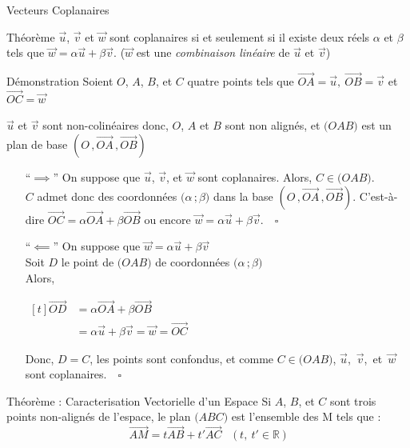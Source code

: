 \documentclass{coursbook}
\begin{document}
\begin{Gpartie}{Vecteurs Coplanaires}
\begin{Spartie}{Théorème}
            $\vec{u}$, $\vec{v}$ et $\vec{w}$ sont coplanaires si et seulement si il existe deux réels $\alpha$ et $\beta$ tels que $\vec{w}=\alpha\vec{u}+\beta\vec{v}$. \quad\big($\vec{w}$ est une \emph{combinaison linéaire} de $\vec{u}$ et $\vec{v}$\big)
            \begin{SSpartie}{Démonstration} 
                Soient $O$, $A$, $B$, et $C$ quatre points tels que $\overrightarrow{OA}=\vec{u},~\overrightarrow{OB}=\vec{v}$ et $\overrightarrow{OC}=\vec{w}$

                $\vec{u}$ et $\vec{v}$ sont non-colinéaires donc, $O$, $A$ et $B$ sont non alignés, et $\big(OAB\big)$ est un plan de base $\left(O\,,\overrightarrow{OA}\,,\overrightarrow{OB}\right)$
                \begin{itemize}[leftmargin=7ex]
                    \item[``$\implies$''] On suppose que $\vec{u}$, $\vec{v}$, et $\vec{w}$ sont coplanaires. Alors, $C\in\big(OAB\big)$. \\ $C$ admet donc des coordonnées $\big(\alpha\,;\beta\big)$ dans la base $\left(O\,,\overrightarrow{OA}\,,\overrightarrow{OB}\right)$. C'est-à-dire $\overrightarrow{OC}=\alpha\overrightarrow{OA}+\beta\overrightarrow{OB}$ ou encore $\vec{w}=\alpha\vec{u}+\beta\vec{v}$.$\quad\square$
                    \item[``$\impliedby$''] On suppose que $\vec{w}=\alpha\vec{u}+\beta\vec{v}$ \\ Soit $D$ le point de $\big(OAB\big)$ de coordonnées $\big(\alpha\,;\beta\big)$ \\ Alors, 
                     
                    $\begin{aligned}[t]
                        \overrightarrow{OD}&=\alpha\overrightarrow{OA}+\beta\overrightarrow{OB} \\
                        &=\alpha\vec{u}+\beta\vec{v}=\vec{w}=\overrightarrow{OC}
                    \end{aligned}$

                    Donc, $D=C$, les points sont confondus, et comme $C\in\big(OAB\big)$, $\vec{u}$,~$\vec{v}$,~et~$\vec{w}$ sont coplanaires.$\quad\square$
                \end{itemize}
            \end{SSpartie}
            \begin{SSpartie}{Théorème : Caracterisation Vectorielle d'un Espace} 
                Si $A$, $B$, et $C$ sont trois points non-alignés de l'espace, le plan $\big(ABC\big)$ est l'ensemble des M tels que : \[\overrightarrow{AM}=t\overrightarrow{AB}+t'\overrightarrow{AC}\quad\big(~t,~t'\in\mathbb{R}~\big)\]
            \end{SSpartie}
        \end{Spartie}
    \end{Gpartie}
\end{document}
